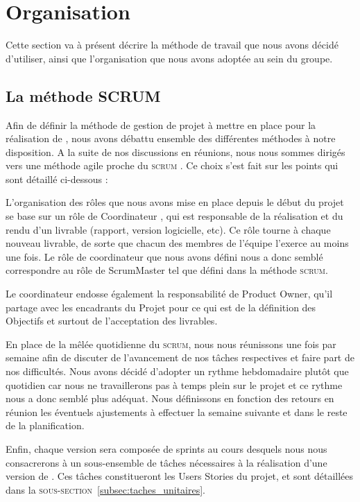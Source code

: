 \section{Organisation}
	\label{sec:orga}

	Cette section va à présent décrire la méthode de travail que nous avons décidé d'utiliser, ainsi que l'organisation que nous avons adoptée au sein du groupe.

	\subsection{La méthode SCRUM}
		\label{subsec:scrum}

	Afin de définir la méthode de gestion de projet à mettre en place pour la réalisation de \glasir{}, nous avons débattu ensemble des différentes méthodes à notre disposition. A la suite de 	nos discussions en réunions, nous nous sommes dirigés vers une méthode agile proche du \og \textsc{scrum} \fg{}. Ce choix s'est fait sur les points qui sont détaillé ci-dessous :

	L'organisation des rôles que nous avons mise en place depuis le début du projet se base sur un rôle de \og Coordinateur \fg{}, qui est responsable de la réalisation et du rendu d'un livrable (rapport, version logicielle, etc). Ce rôle tourne à chaque nouveau livrable, de sorte que chacun des membres de l'équipe l'exerce au moins une fois. Le rôle de coordinateur que nous avons défini nous a donc semblé correspondre au rôle de ScrumMaster tel que défini dans la méthode \textsc{scrum}.

	Le coordinateur endosse également la responsabilité de Product Owner, qu'il partage avec les encadrants du Projet pour ce qui est de la définition des Objectifs et surtout de l'acceptation des livrables.

	En place de la mêlée quotidienne du \textsc{scrum}, nous nous réunissons une fois par semaine afin de discuter de l'avancement de nos tâches respectives et faire part de nos difficultés. Nous avons décidé d'adopter un rythme hebdomadaire plutôt que quotidien car nous ne travaillerons pas à temps plein sur le projet et ce rythme nous a donc semblé plus adéquat. Nous définissons en fonction des retours en réunion les éventuels ajustements à effectuer la semaine suivante et dans le reste de la planification.

	Enfin, chaque version sera composée de sprints au cours desquels nous nous consacrerons à un sous-ensemble de tâches nécessaires à la réalisation d'une version de \glasir{}. Ces tâches constitueront les Users Stories du projet, et sont détaillées dans la \textsc{sous-section}~\ref{subsec:taches_unitaires}.  
	
